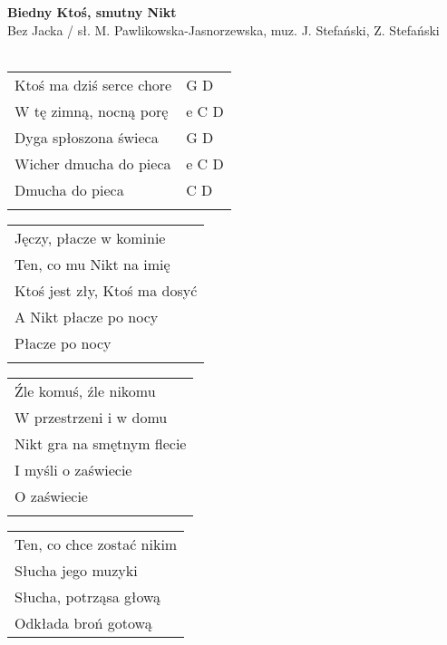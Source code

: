 \documentclass[a5paper]{article}
\begin{document}


\noindent
\fontsize{12pt}{15pt}\selectfont
\textbf{Biedny Ktoś, smutny Nikt} \\
\fontsize{8pt}{10pt}\selectfont
Bez Jacka / sł. M. Pawlikowska-Jasnorzewska, muz. J. Stefański, Z. Stefański \\ \\
\fontsize{10pt}{12pt}\selectfont
{}
\begin{tabular}{@{}p{7cm}p{3cm}@{}}
\noindent
Ktoś ma dziś serce chore & G D\\
W tę zimną, nocną porę & e C D \\
Dyga spłoszona świeca & G D \\
Wicher dmucha do pieca & e C D \\
Dmucha do pieca & C D \\ \\
\end{tabular}

\noindent
\begin{tabular}{@{}p{9.5cm}@{}}
Jęczy, płacze w kominie \\
Ten, co mu Nikt na imię \\
Ktoś jest zły, Ktoś ma dosyć \\
A Nikt płacze po nocy \\
Płacze po nocy \\ \\
\end{tabular}

\noindent
\begin{tabular}{@{}p{9.5cm}@{}}
Źle komuś, źle nikomu \\
W przestrzeni i w domu \\
Nikt gra na smętnym flecie \\
I myśli o zaświecie \\ 
O zaświecie \\ \\
\end{tabular}

\noindent
\begin{tabular}{@{}p{9.5cm}@{}}
Ten, co chce zostać nikim \\ 
Słucha jego muzyki \\
Słucha, potrząsa głową \\
Odkłada broń gotową
\end{tabular}
\end{document}
